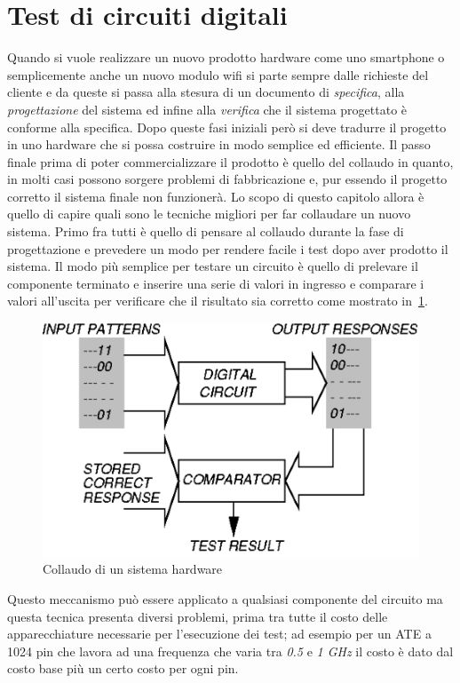 \section{Test di circuiti digitali}\label{capitolo1}
Quando si vuole realizzare un nuovo prodotto hardware come uno smartphone o semplicemente anche un nuovo modulo wifi si parte sempre dalle richieste del cliente e da queste si passa alla stesura di un documento di \emph{specifica}, alla \emph{progettazione} del sistema ed infine alla \emph{verifica} che il sistema progettato è conforme alla specifica. Dopo queste fasi iniziali però si deve tradurre il progetto in uno hardware che si possa costruire in modo semplice ed efficiente. Il passo finale prima di poter commercializzare il prodotto è quello del collaudo in quanto, in molti casi possono sorgere problemi di fabbricazione e, pur essendo il progetto corretto il sistema finale non funzionerà. Lo scopo di questo capitolo allora è quello di capire quali sono le tecniche migliori per far collaudare un nuovo sistema. Primo fra tutti è quello di pensare al collaudo durante la fase di progettazione e prevedere un modo per rendere facile i test dopo aver prodotto il sistema.
Il modo più semplice per testare un circuito è quello di prelevare il componente terminato e inserire una serie di valori in ingresso e comparare i valori all'uscita per verificare che il risultato sia corretto come mostrato in \figurename\,\ref{fig:testbasic}.\\
\begin{figure}[b]
\centering
\includegraphics[scale=0.35]{img/testbase.png}
\caption{Collaudo di un sistema hardware}\label{fig:testbasic}
\end{figure}
Questo meccanismo può essere applicato a qualsiasi componente del circuito ma questa tecnica presenta diversi problemi, prima tra tutte il costo delle apparecchiature necessarie per l'esecuzione dei test; ad esempio per un ATE a 1024 pin che lavora ad una frequenza che varia tra \emph{0.5} e \emph{1 GHz} il costo è dato dal costo base più un certo costo per ogni pin.
